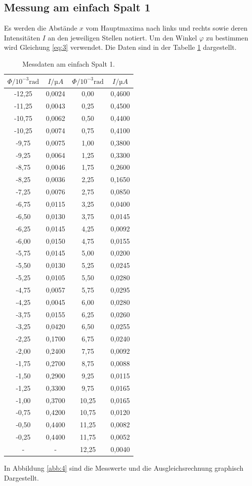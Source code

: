 \subsection{Messung am einfach Spalt 1}
Es werden die Abstände $x$ vom Hauptmaxima nach links und rechts sowie deren Intensitäten $I$
an den jeweiligen Stellen notiert. Um den Winkel $\varphi$ zu bestimmen wird Gleichung
\ref{eq:3} verwendet.
Die Daten sind in der Tabelle \ref{tab:1} dargestellt.
\begin{table}[H]
  \centering
  \caption{Messdaten am einfach Spalt 1.}
  \label{tab:1}
  \begin{tabular}{c c c c}
    \toprule
    $\Phi / 10^{-3}\text{rad}$ & $I / µA $ &$\Phi / 10^{-3}\text{rad}$ & $I / µA$\\
    \midrule
    -12,25& 0,0024 & 0,00 & 0,4600\\
    -11,25& 0,0043 & 0,25 & 0,4500\\
    -10,75& 0,0062 & 0,50 & 0,4400\\
    -10,25& 0,0074 & 0,75 & 0,4100\\
    -9,75 & 0,0075 & 1,00 & 0,3800\\
    -9,25 & 0,0064 & 1,25 & 0,3300\\
    -8,75 & 0,0046 & 1,75 & 0,2600\\
    -8,25 & 0,0036 & 2,25 & 0,1650\\
    -7,25 & 0,0076 & 2,75 & 0,0850\\
    -6,75 & 0,0115 & 3,25 & 0,0400\\
    -6,50 & 0,0130 & 3,75 & 0,0145\\
    -6,25 & 0,0145 & 4,25 & 0,0092\\
    -6,00 & 0,0150 & 4,75 & 0,0155\\
    -5,75 & 0,0145 & 5,00 & 0,0200\\
    -5,50 & 0,0130 & 5,25 & 0,0245\\
    -5,25 & 0,0105 & 5,50 & 0,0280\\
    -4,75 & 0,0057 & 5,75 & 0,0295\\
    -4,25 & 0,0045 & 6,00 & 0,0280\\
    -3,75 & 0,0155 & 6,25 & 0,0260\\
    -3,25 & 0,0420 & 6,50 & 0,0255\\
    -2,25 & 0,1700 & 6,75 & 0,0240\\
    -2,00 & 0,2400 & 7,75 & 0,0092\\
    -1,75 & 0,2700 & 8,75 & 0,0088\\
    -1,50 & 0,2900 & 9,25 & 0,0115\\
    -1,25 & 0,3300 & 9,75 & 0,0165\\
    -1,00 & 0,3700 & 10,25& 0,0165\\
    -0,75 & 0,4200 & 10,75& 0,0120\\
    -0,50 & 0,4400 & 11,25& 0,0082\\
    -0,25 & 0,4400 & 11,75& 0,0052\\
        - &     -  & 12,25& 0,0040\\
    \midrule
    \bottomrule
  \end{tabular}
\end{table}
In Abbildung \ref{abb:4} sind die Messwerte und die Ausgleichsrechnung graphisch Dargestellt.

